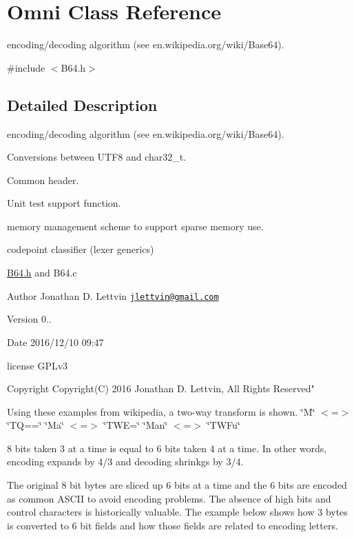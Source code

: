 \hypertarget{class_omni}{}\section{Omni Class Reference}
\label{class_omni}


encoding/decoding algorithm (see en.\+wikipedia.\+org/wiki/\+Base64).  




{\ttfamily \#include $<$B64.\+h$>$}



\subsection{Detailed Description}
encoding/decoding algorithm (see en.\+wikipedia.\+org/wiki/\+Base64). 

Conversions between U\+T\+F8 and char32\+\_\+t.

Common header.

Unit test support function.

memory management scheme to support sparse memory use.

codepoint classifier (lexer generics)

\hyperlink{_b64_8h_source}{B64.\+h} and B64.\+c

\begin{DoxyAuthor}{Author}
Jonathan D. Lettvin \href{mailto:jlettvin@gmail.com}{\tt jlettvin@gmail.\+com}
\end{DoxyAuthor}
\begin{DoxyVersion}{Version}
0..
\end{DoxyVersion}
\begin{DoxyDate}{Date}
2016/12/10 09\+:47
\end{DoxyDate}
license G\+P\+Lv3

\begin{DoxyCopyright}{Copyright}
Copyright(\+C) 2016 Jonathan D. Lettvin, All Rights Reserved"
\end{DoxyCopyright}
Using these examples from wikipedia, a two-\/way transform is shown. \char`\"{}\+M\char`\"{} $<$=$>$ \char`\"{}\+T\+Q==\char`\"{} \char`\"{}\+Ma\char`\"{} $<$=$>$ \char`\"{}\+T\+W\+E=\char`\"{} \char`\"{}\+Man\char`\"{} $<$=$>$ \char`\"{}\+T\+W\+Fu\char`\"{}

8 bits taken 3 at a time is equal to 6 bits taken 4 at a time. In other words, encoding expands by 4/3 and decoding shrinkgs by 3/4.

The original 8 bit bytes are sliced up 6 bits at a time and the 6 bits are encoded as common A\+S\+C\+I\+I to avoid encoding problems. The absence of high bits and control characters is historically valuable. The example below shows how 3 bytes is converted to 6 bit fields and how those fields are related to encoding letters.

